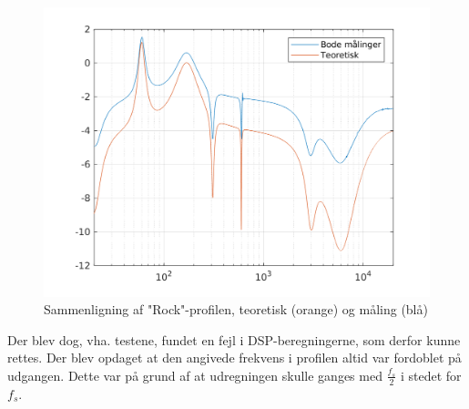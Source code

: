 \begin{figure}[h!]
	\centering
	\includegraphics[width=15cm]{billeder/rock_test}
	\caption{Sammenligning af "Rock"-profilen, teoretisk (orange) og måling (blå)}
	\label{fig:rock_test}
\end{figure}

Der blev dog, vha. testene, fundet en fejl i DSP-beregningerne, som derfor kunne rettes. Der blev opdaget at den angivede frekvens i profilen altid var fordoblet på udgangen. Dette var på grund af at udregningen skulle ganges med $\frac{f_s}{2}$ i stedet for $f_s$.

